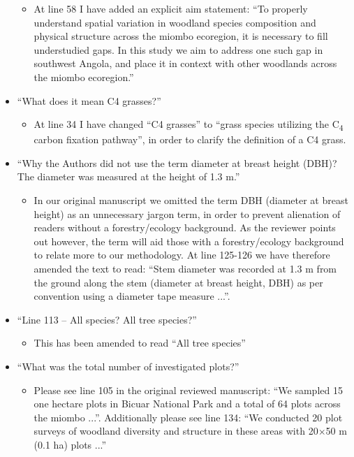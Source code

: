 \documentclass[a4paper]{letter}
\begin{document}
\begin{letter}{}
\begin{itemize}
		\begin{itemize}
			\item{At line 58 I have added an explicit aim statement: ``To properly understand spatial variation in woodland species composition and physical structure across the miombo ecoregion, it is necessary to fill understudied gaps. In this study we aim to address one such gap in southwest Angola, and place it in context with other woodlands across the miombo ecoregion.''}
		\end{itemize}
	\item{``What does it mean C4 grasses?''}
		\begin{itemize}
			\item{At line 34 I have changed ``C4 grasses'' to ``grass species utilizing the C\textsubscript{4} carbon fixation pathway'', in order to clarify the definition of a C4 grass.}
		\end{itemize}
	\item{``Why the Authors did not use the term diameter at breast height (DBH)? The diameter was measured at the height of 1.3 m.''}
		\begin{itemize}
			\item{In our original manuscript we omitted the term DBH (diameter at breast height) as an unnecessary jargon term, in order to prevent alienation of readers without a forestry/ecology background. As the reviewer points out however, the term will aid those with a forestry/ecology background to relate more to our methodology. At line 125-126 we have therefore amended the text to read: ``Stem diameter was recorded at 1.3 m from the ground along the stem (diameter at breast height, DBH) as per convention using a diameter tape measure ...''.}
		\end{itemize}
	\item{``Line 113 – All species? All tree species?''}
		\begin{itemize}
			\item{This has been amended to read ``All tree species''}
		\end{itemize}
	\item{``What was the total number of investigated plots?''}
		\begin{itemize}
			\item{Please see line 105 in the original reviewed manuscript: ``We sampled 15 one hectare plots in Bicuar National Park and a total of 64 plots across the miombo ...''. Additionally please see line 134: ``We conducted 20 plot surveys of woodland diversity and structure in these areas with 20$\times$50 m (0.1 ha) plots ...''}

\end{itemize}
\end{itemize}
\end{letter}
\end{document}
